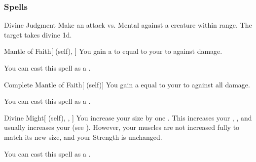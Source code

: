 \subsubsection{Spells}


\lowercase{\hypertarget{spell:Divine Judgment}{}}\label{spell:Divine Judgment}
\begin{freeability}[\nth{1}]{\hypertarget{spell:Divine Judgment}{Divine Judgment}}
Make an attack vs. Mental against a creature within \rngmed range.
\hit The target takes divine  \plus1d.
\end{freeability}
\vspace{0.25em}



\lowercase{\hypertarget{spell:Mantle of Faith}{}}\label{spell:Mantle of Faith}
\begin{attuneability}[\nth{1}]{\hypertarget{spell:Mantle of Faith}{Mantle of Faith}}[ (self), ]
You gain a  to equal to your  to  against  damage.

You can cast this spell as a .
\end{attuneability}
\vspace{0.25em}



\lowercase{\hypertarget{spell:Complete Mantle of Faith}{}}\label{spell:Complete Mantle of Faith}
\begin{attuneability}[\nth{2}]{\hypertarget{spell:Complete Mantle of Faith}{Complete Mantle of Faith}}[ (self)]
You gain a  equal to your  to  against all damage.

You can cast this spell as a .
\end{attuneability}
\vspace{0.25em}



\lowercase{\hypertarget{spell:Divine Might}{}}\label{spell:Divine Might}
\begin{attuneability}[\nth{3}]{\hypertarget{spell:Divine Might}{Divine Might}}[ (self), , ]
You increase your size by one .
This increases your , , and usually increases your  (see ).
However, your muscles are not increased fully to match its new size, and your Strength is unchanged.

You can cast this spell as a .
\end{attuneability}
\vspace{0.25em}




